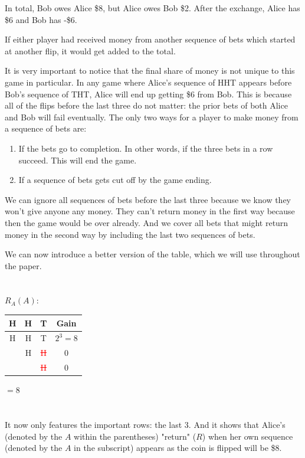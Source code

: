 \documentclass[english,12pt,a4paper,final]{article}
\begin{document}
In total, Bob owes Alice \$8, but Alice owes Bob \$2. After the exchange, Alice has \$6 and Bob has -\$6.

If either player had received money from another sequence of bets which started at another flip, it would get added to the total.

It is very important to notice that the final share of money is not unique to this game in particular. In any game where Alice's sequence of HHT appears before Bob's sequence of THT, Alice will end up getting \$6 from Bob. This is because all of the flips before the last three do not matter: the prior bets of both Alice and Bob will fail eventually. The only two ways for a player to make money from a sequence of bets are:

\begin{enumerate}
	\item If the bets go to completion. In other words, if the three bets in a row succeed. This will end the game.
	\item If a sequence of bets gets cut off by the game ending.
\end{enumerate}

We can ignore all sequences of bets before the last three because we know they won't give anyone any money. They can't return money in the first way because then the game would be over already. And we cover all bets that might return money in the second way by including the last two sequences of bets.

We can now introduce a better version of the table, which we will use throughout the paper.
\\\\\\
$R_A(A)$:
\begin{tabular}{|ccc|c|}
	\hline
	H & H & T & Gain \\
	\hline
	
	\textcolor{OliveGreen}{H} & \textcolor{OliveGreen}{H} & \textcolor{OliveGreen}{T} & $2^3=8$ \\
	
	& \textcolor{OliveGreen}{H} & \textcolor{red}{\sout{H}} & $0$ \\
	
	&  & \textcolor{red}{\sout{H}} & $0$ \\
	\hline
\end{tabular}
$=8$
\\\\\\
It now only features the important rows: the last 3. And it shows that Alice's (denoted by the $A$ within the parentheses) "return" ($R$) when her own sequence (denoted by the $A$ in the subscript) appears as the coin is flipped will be \$8.
\end{document}
